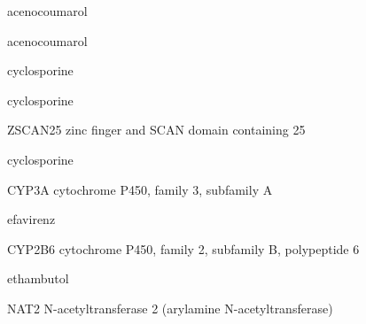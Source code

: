 \documentclass{resume} %
\begin{document}
\begin{rSection}{ acenocoumarol }
\begin{rSection}{ acenocoumarol }
\begin{rSection}{ cyclosporine }
\begin{rSection}{ cyclosporine }
\begin{rSubsection}{ ZSCAN25 }{ zinc finger and SCAN domain containing 25 }{}{}
\end{rSubsection}
\begin{rSection}{ cyclosporine }
\item[]
\begin{rSubsection}{ CYP3A }{ cytochrome P450, family 3, subfamily A }{}{}
\item[]


\end{rSubsection}

\end{rSection}
\begin{rSection}{ efavirenz }
\item[]
\begin{rSubsection}{ CYP2B6 }{ cytochrome P450, family 2, subfamily B, polypeptide 6 }{}{}
\item[]


\end{rSubsection}

\end{rSection}
\begin{rSection}{ ethambutol }
\item[]
\begin{rSubsection}{ NAT2 }{ N-acetyltransferase 2 (arylamine N-acetyltransferase) }{}{}
\item[]


\end{rSubsection}


\end{rSection}
\end{rSection}
\end{rSection}
\end{rSection}
\end{rSection}
\end{document}

